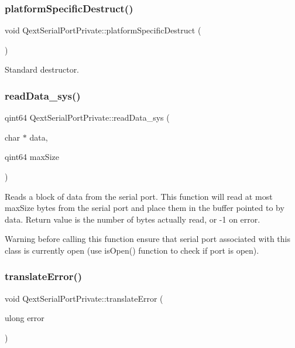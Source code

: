 \subsubsection{\texorpdfstring{platform\+Specific\+Destruct()}{platformSpecificDestruct()}}
{\footnotesize\ttfamily void Qext\+Serial\+Port\+Private\+::platform\+Specific\+Destruct (\begin{DoxyParamCaption}{ }\end{DoxyParamCaption})}

Standard destructor. \mbox{\label{classQextSerialPortPrivate_ab4a75579c479ccebb5f325af737a7045}} 
\subsubsection{\texorpdfstring{read\+Data\+\_\+sys()}{readData\_sys()}}
{\footnotesize\ttfamily qint64 Qext\+Serial\+Port\+Private\+::read\+Data\+\_\+sys (\begin{DoxyParamCaption}\item[{char $\ast$}]{data,  }\item[{qint64}]{max\+Size }\end{DoxyParamCaption})}

Reads a block of data from the serial port. This function will read at most max\+Size bytes from the serial port and place them in the buffer pointed to by data. Return value is the number of bytes actually read, or -\/1 on error.

\begin{DoxyWarning}{Warning}
before calling this function ensure that serial port associated with this class is currently open (use is\+Open() function to check if port is open). 
\end{DoxyWarning}
\mbox{\label{classQextSerialPortPrivate_af504151e61016c5e8a6d93378b834602}} 
\subsubsection{\texorpdfstring{translate\+Error()}{translateError()}}
{\footnotesize\ttfamily void Qext\+Serial\+Port\+Private\+::translate\+Error (\begin{DoxyParamCaption}\item[{ulong}]{error }\end{DoxyParamCaption})}

